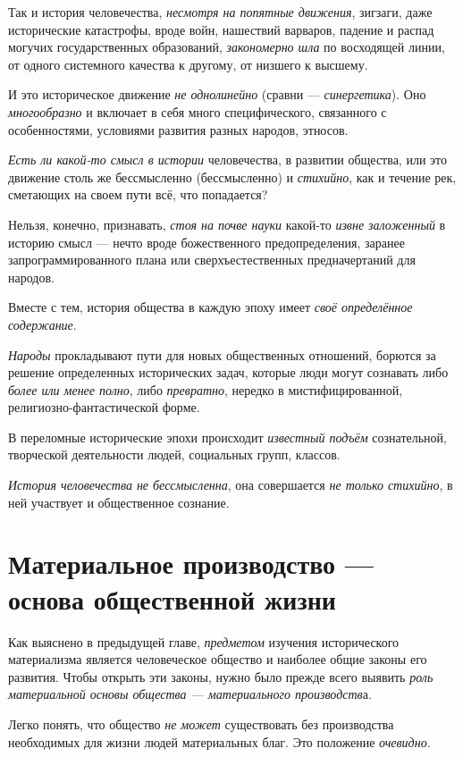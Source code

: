 \documentclass[a4paper,14pt,russian]{extreport}
\begin{document}
Так и история человечества, \emph{несмотря на попятные движения}, зигзаги, даже исторические катастрофы, вроде войн, нашествий варваров, падение и распад могучих государственных образований, \emph{закономерно шла} по восходящей линии, от одного системного качества к другому, от низшего к высшему.

И это историческое движение \emph{не однолинейно} (сравни --- \emph{синергетика}). Оно \emph{многообразно} и включает в себя много специфического, связанного с особенностями, условиями развития разных народов, этносов.

\emph{Есть ли какой-то смысл в истории} человечества, в развитии общества, или это движение столь же бессмысленно (бессмысленно) и \emph{стихийно}, как и течение рек, сметающих на своем пути всё, что попадается?

Нельзя, конечно, признавать, \emph{стоя на почве науки} какой-то \emph{извне заложенный} в историю смысл --- нечто вроде божественного предопределения, заранее запрограммированного плана или сверхъестественных предначертаний для народов.

Вместе с тем, история общества в каждую эпоху имеет \emph{своё определённое содержание}.

\emph{Народы} прокладывают пути для новых общественных отношений, борются за решение определенных исторических задач, которые люди могут сознавать либо \emph{более или менее полно}, либо \emph{превратно}, нередко в мистифицированной, религиозно-фантастической форме.

В переломные исторические эпохи происходит \emph{известный подъём} сознательной, творческой деятельности людей, социальных групп, классов.

\emph{История человечества не бессмысленна}, она совершается \emph{не только стихийно}, в ней участвует и общественное сознание.

\section{Материальное производство --- основа общественной жизни}

Как выяснено в предыдущей главе, \emph{предметом} изучения исторического материализма является человеческое общество и наиболее общие законы его развития. Чтобы открыть эти законы, нужно было прежде всего выявить \emph{роль материальной основы общества --- материального производств}а.

Легко понять, что общество \emph{не может} существовать без производства необходимых для жизни людей материальных благ. Это положение \emph{очевидно}.
\end{document}
